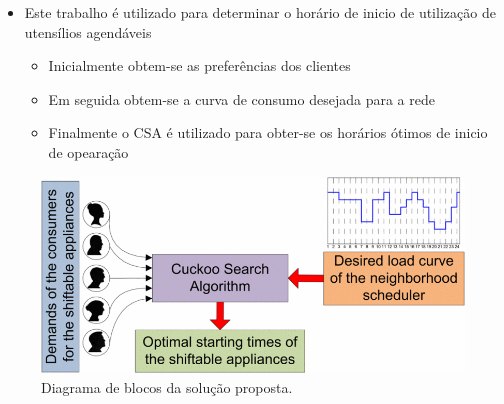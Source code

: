 \begin{frame}
  \begin{block}{}
    \begin{itemize}
      \item Este trabalho é utilizado para determinar o horário de inicio de
      utilização de \alert{utensílios agendáveis}
      \begin{itemize}
        \item Inicialmente obtem-se as preferências dos clientes
        \item Em seguida obtem-se a curva de consumo desejada para a rede
        \item Finalmente o CSA é utilizado para obter-se os horários ótimos de
        inicio de opearação
      \end{itemize}
    \end{itemize}
  \end{block}
  \begin{figure}[h]
  	\begin{center}
      \includegraphics [scale=0.28]{./Figures/CSscheme}
      \caption {Diagrama de blocos da solução proposta.}
  	\end{center}
  \end{figure}
\end{frame}



